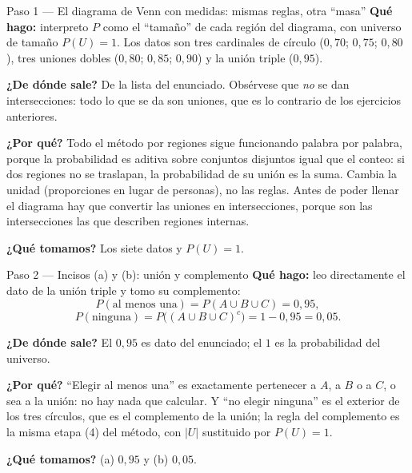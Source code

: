 \documentclass[11pt]{article}
\begin{document}
\begin{paso}{Paso 1 --- El diagrama de Venn con medidas: mismas reglas, otra ``masa''}
\textbf{Qué hago:} interpreto $P$ como el ``tamaño'' de cada región del diagrama, con universo de tamaño
$P(U)=1$. Los datos son tres cardinales de círculo ($0{,}70$; $0{,}75$; $0{,}80$), tres uniones dobles
($0{,}80$; $0{,}85$; $0{,}90$) y la unión triple ($0{,}95$).

\textbf{¿De dónde sale?} De la lista del enunciado. Obsérvese que \emph{no} se dan intersecciones: todo lo
que se da son uniones, que es lo contrario de los ejercicios anteriores.

\textbf{¿Por qué?} Todo el método por regiones sigue funcionando palabra por palabra, porque la
probabilidad es aditiva sobre conjuntos disjuntos igual que el conteo: si dos regiones no se traslapan,
la probabilidad de su unión es la suma. Cambia la unidad (proporciones en lugar de personas), no las
reglas. Antes de poder llenar el diagrama hay que convertir las uniones en intersecciones, porque son las
intersecciones las que describen regiones internas.

\textbf{¿Qué tomamos?} Los siete datos y $P(U)=1$.
\end{paso}

\begin{paso}{Paso 2 --- Incisos (a) y (b): unión y complemento}
\textbf{Qué hago:} leo directamente el dato de la unión triple y tomo su complemento:
\[
P(\text{al menos una}) = P(A\cup B\cup C) = 0{,}95,
\]
\[
P(\text{ninguna}) = P\big((A\cup B\cup C)^{c}\big) = 1 - 0{,}95 = 0{,}05 .
\]

\textbf{¿De dónde sale?} El $0{,}95$ es dato del enunciado; el $1$ es la probabilidad del universo.

\textbf{¿Por qué?} ``Elegir al menos una'' es exactamente pertenecer a $A$, a $B$ o a $C$, o sea a la
unión: no hay nada que calcular. Y ``no elegir ninguna'' es el exterior de los tres círculos, que es el
complemento de la unión; la regla del complemento es la misma etapa (4) del método, con $|U|$ sustituido
por $P(U)=1$.

\textbf{¿Qué tomamos?} (a) $0{,}95$ y (b) $0{,}05$.
\end{paso}
\end{document}
